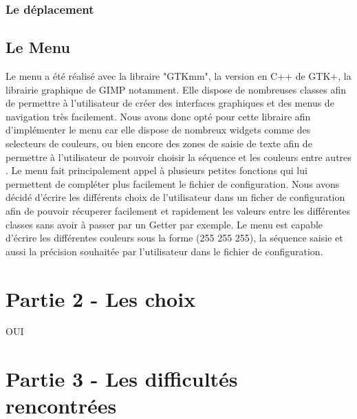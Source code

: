 \documentclass{article}
\begin{document}
    \subsubsection*{Le déplacement}



\subsection*{Le Menu}
Le menu a été réalisé avec la libraire "GTKmm", la version en C++ de GTK+, la librairie graphique de GIMP notamment. Elle dispose de nombreuses classes afin de permettre à l'utilisateur de créer des interfaces graphiques et des menus de navigation très facilement. Nous avons donc opté pour cette libraire afin d'implémenter le menu car elle dispose de nombreux widgets comme des selecteurs de couleurs, ou bien encore des zones de saisie de texte afin de permettre à l'utilisateur de pouvoir choisir la séquence et les couleurs entre autres . Le menu fait principalement appel à plusieurs petites fonctions qui lui permettent de compléter plus facilement le fichier de configuration. Nous avons décidé d'écrire les différents choix de l'utilisateur dans un ficher de configuration afin de pouvoir récuperer facilement et rapidement les valeurs entre les différentes classes sans avoir à passer par un Getter par exemple. Le menu est capable d'écrire les différentes couleurs sous la forme (255 255 255), la séquence saisie et aussi la précision souhaitée par l'utilisateur dans le fichier de configuration. 

\section* {Partie 2 - Les choix}
OUI

\section* {Partie 3 - Les difficultés rencontrées}
\end{document}
